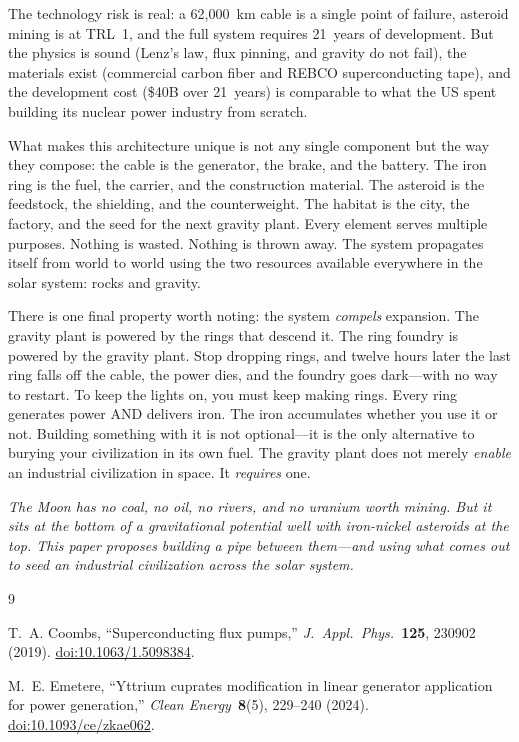 \documentclass[12pt,letterpaper]{article}
\begin{document}
The technology risk is real: a 62,000~km cable is a single point of failure, asteroid mining is at TRL~1, and the full system requires 21~years of development. But the physics is sound (Lenz's law, flux pinning, and gravity do not fail), the materials exist (commercial carbon fiber and REBCO superconducting tape), and the development cost (\$40B over 21~years) is comparable to what the US spent building its nuclear power industry from scratch.

What makes this architecture unique is not any single component but the way they compose: the cable is the generator, the brake, and the battery. The iron ring is the fuel, the carrier, and the construction material. The asteroid is the feedstock, the shielding, and the counterweight. The habitat is the city, the factory, and the seed for the next gravity plant. Every element serves multiple purposes. Nothing is wasted. Nothing is thrown away. The system propagates itself from world to world using the two resources available everywhere in the solar system: rocks and gravity.

There is one final property worth noting: the system \emph{compels} expansion. The gravity plant is powered by the rings that descend it. The ring foundry is powered by the gravity plant. Stop dropping rings, and twelve hours later the last ring falls off the cable, the power dies, and the foundry goes dark---with no way to restart. To keep the lights on, you must keep making rings. Every ring generates power AND delivers iron. The iron accumulates whether you use it or not. Building something with it is not optional---it is the only alternative to burying your civilization in its own fuel. The gravity plant does not merely \emph{enable} an industrial civilization in space. It \emph{requires} one.

\vspace{1cm}
\noindent\textit{The Moon has no coal, no oil, no rivers, and no uranium worth mining. But it sits at the bottom of a gravitational potential well with iron-nickel asteroids at the top. This paper proposes building a pipe between them---and using what comes out to seed an industrial civilization across the solar system.}

\begin{thebibliography}{9}

T.~A. Coombs,
``Superconducting flux pumps,''
\textit{J.\ Appl.\ Phys.}\ \textbf{125}, 230902 (2019).
\href{https://doi.org/10.1063/1.5098384}{doi:10.1063/1.5098384}.

M.~E. Emetere,
``Yttrium cuprates modification in linear generator application for power generation,''
\textit{Clean Energy}\ \textbf{8}(5), 229--240 (2024).
\href{https://doi.org/10.1093/ce/zkae062}{doi:10.1093/ce/zkae062}.

\end{thebibliography}
\end{document}
